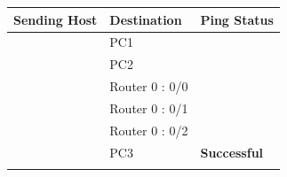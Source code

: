 \documentclass[a4paper,11pt]{article}
\begin{document}
\begin{enumerate}
\begin{table}[H]
              \begin{tabular}{| m{10em}| m{10em}| m{10em} |}
                  \hline
                  \multicolumn{1}{|l|}{\textbf{Sending Host}}                     & \textbf{Destination} & \multicolumn{1}{l|}{\textbf{Ping Status}}                             \\
                  \hline
                  {\cellcolor[rgb]{0.141,0.525,1}}                                & PC1                  & {\cellcolor[rgb]{0.404,1,0.835}}                                      \\
                  \hhline{|>{\arrayrulecolor[rgb]{0.141,0.525,1}}->{\arrayrulecolor{black}}->{\arrayrulecolor[rgb]{0.404,1,0.835}}->{\arrayrulecolor{black}}|}
                  {\cellcolor[rgb]{0.141,0.525,1}}                                & PC2                  & {\cellcolor[rgb]{0.404,1,0.835}}                                      \\
                  \hhline{|>{\arrayrulecolor[rgb]{0.141,0.525,1}}->{\arrayrulecolor{black}}->{\arrayrulecolor[rgb]{0.404,1,0.835}}->{\arrayrulecolor{black}}|}
                  {\cellcolor[rgb]{0.141,0.525,1}}                                & Router 0 : 0/0       & {\cellcolor[rgb]{0.404,1,0.835}}                                      \\
                  \hhline{|>{\arrayrulecolor[rgb]{0.141,0.525,1}}->{\arrayrulecolor{black}}->{\arrayrulecolor[rgb]{0.404,1,0.835}}->{\arrayrulecolor{black}}|}
                  {\cellcolor[rgb]{0.141,0.525,1}}                                & Router 0 : 0/1       & {\cellcolor[rgb]{0.404,1,0.835}}                                      \\
                  \hhline{|>{\arrayrulecolor[rgb]{0.141,0.525,1}}->{\arrayrulecolor{black}}->{\arrayrulecolor[rgb]{0.404,1,0.835}}->{\arrayrulecolor{black}}|}
                  {\cellcolor[rgb]{0.141,0.525,1}}                                & Router 0 : 0/2       & {\cellcolor[rgb]{0.404,1,0.835}}                                      \\
                  \hhline{|>{\arrayrulecolor[rgb]{0.141,0.525,1}}->{\arrayrulecolor{black}}->{\arrayrulecolor[rgb]{0.404,1,0.835}}->{\arrayrulecolor{black}}|}
                  {\cellcolor[rgb]{0.141,0.525,1}}                                & PC3                  & \multirow{-6}{*}{{\cellcolor[rgb]{0.404,1,0.835}}\textbf{Successful}} \\
                  \hhline{|>{\arrayrulecolor[rgb]{0.141,0.525,1}}->{\arrayrulecolor{black}}--|}

\end{tabular}
\end{table}
\end{enumerate}
\end{document}
